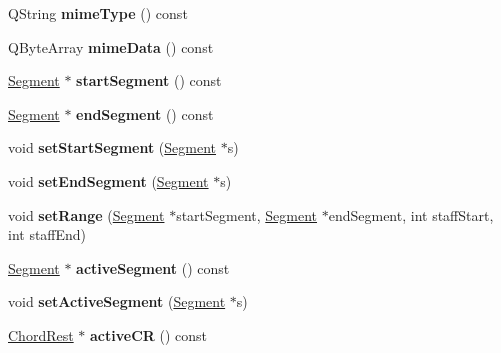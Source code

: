 \begin{DoxyCompactItemize}
Q\+String {\bfseries mime\+Type} () const
\item 
\mbox{\label{class_ms_1_1_selection_a240f8c2954141765a38e366e11c2fb6b}} 
Q\+Byte\+Array {\bfseries mime\+Data} () const
\item 
\mbox{\label{class_ms_1_1_selection_a52a5707191f5035bfda106c54df906d7}} 
\hyperlink{class_ms_1_1_segment}{Segment} $\ast$ {\bfseries start\+Segment} () const
\item 
\mbox{\label{class_ms_1_1_selection_a125e47fae45ef55211b0297dc96754ad}} 
\hyperlink{class_ms_1_1_segment}{Segment} $\ast$ {\bfseries end\+Segment} () const
\item 
\mbox{\label{class_ms_1_1_selection_ab2bda8fca30667518c7470239625cbe1}} 
void {\bfseries set\+Start\+Segment} (\hyperlink{class_ms_1_1_segment}{Segment} $\ast$s)
\item 
\mbox{\label{class_ms_1_1_selection_ab677f8c59d58a7a4649c009cc6abb200}} 
void {\bfseries set\+End\+Segment} (\hyperlink{class_ms_1_1_segment}{Segment} $\ast$s)
\item 
\mbox{\label{class_ms_1_1_selection_adfb97ae90a1ca72987dabc0c4bd6ab14}} 
void {\bfseries set\+Range} (\hyperlink{class_ms_1_1_segment}{Segment} $\ast$start\+Segment, \hyperlink{class_ms_1_1_segment}{Segment} $\ast$end\+Segment, int staff\+Start, int staff\+End)
\item 
\mbox{\label{class_ms_1_1_selection_aa786fedbec80a43a1d1811fe6ce0f502}} 
\hyperlink{class_ms_1_1_segment}{Segment} $\ast$ {\bfseries active\+Segment} () const
\item 
\mbox{\label{class_ms_1_1_selection_aa70d94a3c3dc8f6fad70fa00c5345962}} 
void {\bfseries set\+Active\+Segment} (\hyperlink{class_ms_1_1_segment}{Segment} $\ast$s)
\item 
\mbox{\label{class_ms_1_1_selection_ac141ec50de40cd4ff66f70371664b22a}} 
\hyperlink{class_ms_1_1_chord_rest}{Chord\+Rest} $\ast$ {\bfseries active\+CR} () const
\item 

\end{DoxyCompactItemize}
